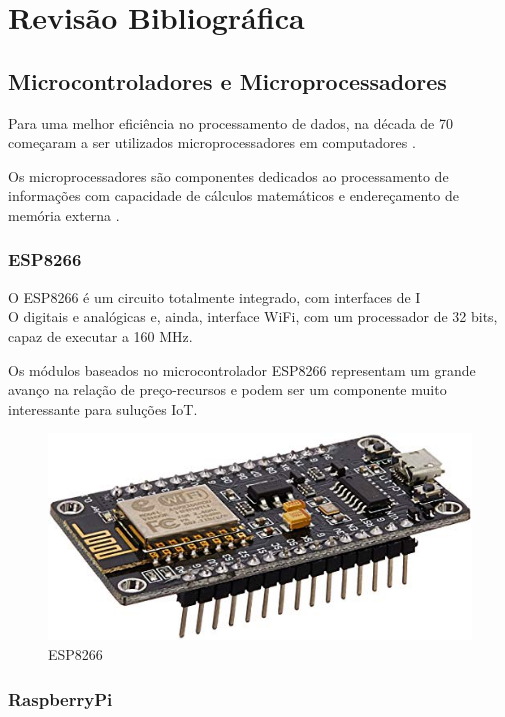 \chapter{Revisão Bibliográfica}

\section{Microcontroladores e Microprocessadores}

Para uma melhor eficiência no processamento de dados, na década de 70
começaram a ser utilizados microprocessadores em computadores \cite{martins2005sistemas}. 

Os microprocessadores são componentes dedicados ao processamento de informações com
capacidade de cálculos matemáticos e endereçamento de memória externa \cite{chase2007sistemas}.

\subsection{ESP8266}

O ESP8266 é um circuito totalmente integrado, com interfaces de I\\O digitais e analógicas e, ainda, interface WiFi, com um processador de 32 bits, capaz de executar a 160 MHz.

Os módulos baseados no microcontrolador ESP8266 representam um grande avanço na relação de preço-recursos e podem ser um componente muito interessante para suluções IoT.\cite {de2017internet}

\begin{figure}[htbp]
		\centering
		\includegraphics[scale=0.5]{figuras/esp8266_.jpg}
		\caption{ESP8266}
		\label{fig:09}
\end{figure}

\subsection{RaspberryPi}

